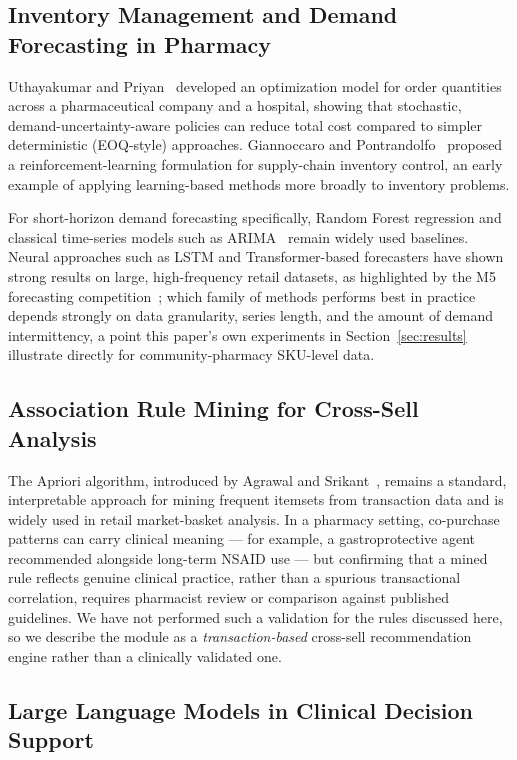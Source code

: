 \documentclass[12pt,a4paper]{article}
\begin{document}
\subsection{Inventory Management and Demand Forecasting in Pharmacy}

Uthayakumar and Priyan~\cite{uthayakumar2013} developed an optimization model for order quantities across a pharmaceutical company and a hospital, showing that stochastic, demand-uncertainty-aware policies can reduce total cost compared to simpler deterministic (EOQ-style) approaches. Giannoccaro and Pontrandolfo~\cite{giannoccaro2002} proposed a reinforcement-learning formulation for supply-chain inventory control, an early example of applying learning-based methods more broadly to inventory problems.

For short-horizon demand forecasting specifically, Random Forest regression and classical time-series models such as ARIMA~\cite{box2015arima} remain widely used baselines. Neural approaches such as LSTM and Transformer-based forecasters have shown strong results on large, high-frequency retail datasets, as highlighted by the M5 forecasting competition~\cite{makridakis2022}; which family of methods performs best in practice depends strongly on data granularity, series length, and the amount of demand intermittency, a point this paper's own experiments in Section~\ref{sec:results} illustrate directly for community-pharmacy SKU-level data.

\subsection{Association Rule Mining for Cross-Sell Analysis}

The Apriori algorithm, introduced by Agrawal and Srikant~\cite{agrawal1994}, remains a standard, interpretable approach for mining frequent itemsets from transaction data and is widely used in retail market-basket analysis. In a pharmacy setting, co-purchase patterns can carry clinical meaning --- for example, a gastroprotective agent recommended alongside long-term NSAID use --- but confirming that a mined rule reflects genuine clinical practice, rather than a spurious transactional correlation, requires pharmacist review or comparison against published guidelines. We have not performed such a validation for the rules discussed here, so we describe the module as a \emph{transaction-based} cross-sell recommendation engine rather than a clinically validated one.

\subsection{Large Language Models in Clinical Decision Support}
\end{document}
